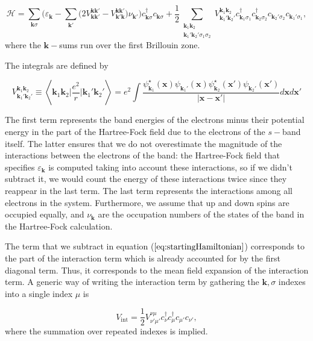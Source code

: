 \begin{equation}\label{eq:startingHamiltonian}
\mathcal{H} = \sum_{\bm k \sigma} \bigg( \varepsilon_{\bm k} - \sum_{ \bm k'} \big( 2 V^{\bm k \bm k'}_{\bm k \bm k'} - V^{\bm k \bm k'}_{\bm k' \bm k} \big) \nu_{\bm k'} \bigg) c_{\bm k \sigma}^\dagger c_{\bm k \sigma} +  \frac{1}{2} \sum_{ \substack{\bm k_1 \bm k_2 \\ \bm k_1' \bm k_2'  \sigma_1 \sigma_2 } } V^{\bm k_1 \bm k_2}_{\bm k_1' \bm k_2'}
 c_{\bm k_1 \sigma_1}^\dagger c_{\bm k_2 \sigma_2}^\dagger c_{\bm k_2' \sigma_2} c_{\bm k_1' \sigma_1} ,
\end{equation}
where the $\bm k-$sums run over the first Brillouin zone.

The integrals are defined by

\begin{equation}\label{eq:integrals}
V^{\bm k_1 \bm k_2}_{\bm k_1' \bm k_2'} \equiv \left\langle \bm k_1 \bm k_2 \bigg| \frac{e^2}{r} \bigg| \bm k_1' \bm k_2' \right\rangle  =  e^2 \int \frac{\psi_{\bm k_1}^\star (\bm x) \psi_{\bm k_1'} (\bm x) \psi_{\bm k_2}^\star (\bm x') \psi_{\bm k_2'}(\bm x') }{| \bm x - \bm x' |} d\bm x d\bm x'
\end{equation}

The first term represents the band energies of the electrons minus their potential energy in the part of the Hartree-Fock field due to the electrons of the $s-$band itself.
The latter ensures that we do not overestimate the magnitude of the interactions between the electrons of the band: the Hartree-Fock field that specifies $\varepsilon_{\bm k}$ is computed taking into account these interactions, so if we didn't subtract it, we would count the energy of these interactions twice since they reappear in the last term.
The last term represents the interactions among all electrons in the system.
Furthermore, we assume that up and down spins are occupied equally, and $\nu_{\bm k}$ are the occupation numbers of the states of the band in the Hartree-Fock calculation. 

The term that we subtract in equation ($\ref{eq:startingHamiltonian}$) corresponds to the part of the interaction term which is already accounted for by the first diagonal  term.
Thus, it corresponds to the mean field expansion of the interaction term.
A generic way of writing the interaction term by gathering the $\bm k, \sigma$ indexes into a single index $\mu$ is

\begin{equation}\label{eq:vInt}
V_{\text{int}} = \frac{1}{2} V^{\nu\mu}_{\nu'\mu'} c_\nu^\dagger c_\mu^\dagger c_{\mu'} c_{\nu'} ,
\end{equation}
where the summation over repeated indexes is implied. 

